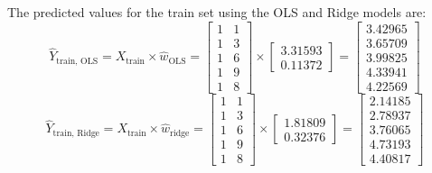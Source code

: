\documentclass[12pt]{article}
\begin{document}
\begin{enumerate}[leftmargin=\labelsep, label=\textbf{\arabic*.)}]
\begin{itemize}
                    The predicted values for the train set using the OLS and Ridge models are:
                    \[
                        \hat{Y}_{\text{train, OLS}} = X_{\text{train}} \times \hat{w}_{\text{OLS}} = \begin{bmatrix} 1 & 1 \\ 1 & 3 \\ 1 & 6 \\ 1 & 9 \\ 1 & 8 \end{bmatrix} \times \begin{bmatrix} 3.31593 \\ 0.11372 \end{bmatrix} = \begin{bmatrix} 3.42965 \\ 3.65709 \\ 3.99825 \\ 4.33941 \\ 4.22569 \end{bmatrix}
                    \]
                    \[
                        \hat{Y}_{\text{train, Ridge}} = X_{\text{train}} \times \hat{w}_{\text{ridge}} = \begin{bmatrix} 1 & 1 \\ 1 & 3 \\ 1 & 6 \\ 1 & 9 \\ 1 & 8 \end{bmatrix} \times \begin{bmatrix} 1.81809 \\ 0.32376 \end{bmatrix} = \begin{bmatrix} 2.14185 \\ 2.78937 \\ 3.76065 \\ 4.73193 \\ 4.40817 \end{bmatrix}
                    \]


\end{itemize}
\end{enumerate}
\end{document}
